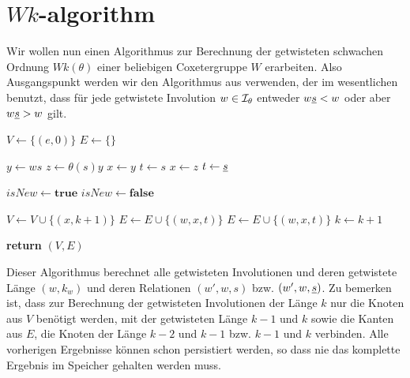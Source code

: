 \section{$Wk$-algorithm}

Wir wollen nun einen Algorithmus zur Berechnung der getwisteten schwachen
Ordnung $Wk(\theta)$ einer beliebigen Coxetergruppe $W$ erarbeiten. Also
Ausgangspunkt werden wir den Algorithmus aus \cite[Algorithm 3.1.1]{haas:twoa}
verwenden, der im wesentlichen benutzt, dass für jede getwistete Involution $w
\in \mathcal{I}_{\theta}$ entweder $w \underline{s} < w$ oder aber $w \underline{s} > w$ gilt.

\begin{algo}[Algorithmus 1]
	\hfill
	\label{twoa1}
	\begin{algorithmic}[1]
	 
	\State $V \gets \{(e,0)\}$
	\State $E \gets \{\}$

			  \State $y \gets ws$
				\State $z \gets \theta(s)y$
					\State $x \gets y$ 
					\State $t \gets s$
				\Else
					\State $x \gets z$ 
					\State $t \gets \underline{s}$
				\EndIf
				
				\State $isNew \gets \textbf{true}$
				 
						\State $isNew \gets \textbf{false}$
					\EndIf
				\EndFor
				
					\State $V \gets V \cup \{ (x,k+1) \}$
					\State $E \gets E \cup \{ (w,x,t) \}$
				\Else
					\State $E \gets E \cup \{ (w,x,t) \}$
				\EndIf
			\EndFor
		\EndFor
		\State $k \gets k + 1$
	\EndFor

	\State \textbf{return} $(V,E)$
	\EndProcedure
	\end{algorithmic}
\end{algo}

Dieser Algorithmus berechnet alle getwisteten Involutionen und deren
getwistete Länge $(w,k_w)$ und deren Relationen $(w',w,s)$ bzw. $(w',w,\underline{s})$. Zu bemerken ist, dass zur Berechnung der ge\-twis\-te\-ten Involutionen der
Länge $k$ nur die Knoten aus $V$ benötigt werden, mit der getwisteten Länge $k-1$ und $k$ sowie
die Kanten aus $E$, die Knoten der Länge $k-2$ und $k-1$ bzw. $k-1$ und $k$
verbinden. Alle vorherigen Ergebnisse können schon persistiert werden, so dass
nie das komplette Ergebnis im Speicher gehalten werden muss.

